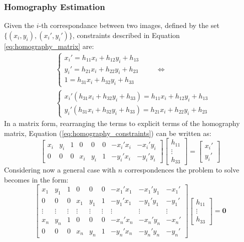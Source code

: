 \subsubsection{Homography Estimation}
Given the $i$-th correspondance between two images, defined by the set 
$\{(x_i, y_i), (x_i', y_i')\}$, constraints described in Equation \ref{eq:homography_matrix}
are:
\begin{align}
&\begin{cases}
    x_i' = h_{11} x_i + h_{12} y_i + h_{13} \\
    y_i' = h_{21} x_i + h_{22} y_i + h_{23} \\
    1 = h_{31} x_i + h_{32} y_i + h_{33}
\end{cases}
\qquad \Longleftrightarrow \nonumber\\[0.2cm]
&\begin{cases}
    x_i' \left(h_{31} x_i + h_{32} y_i + h_{33}\right) = h_{11} x_i + h_{12} y_i + h_{13} \\
    y_i' \left(h_{31} x_i + h_{32} y_i + h_{33}\right) = h_{21} x_i + h_{22} y_i + h_{23}
    \label{eq:homography_constraints}
\end{cases}
\end{align}
In a matrix form, rearranging the terms to explicit terms of the homography matrix,
Equation (\ref{eq:homography_constraints}) can be written as:
\begin{equation}
    \begin{bmatrix}
        x_i & y_i & 1 & 0 & 0 & 0 & -x_i'x_i & -x_i'y_i \\
        0 & 0 & 0 & x_i & y_i & 1 & -y_i'x_i & -y_i'y_i
    \end{bmatrix}
    \begin{bmatrix}
        h_{11} \\
        \vdots \\
        h_{33}
    \end{bmatrix}
    =
    \begin{bmatrix}
        x_i' \\
        y_i'
    \end{bmatrix}
    \label{eq:homography_matrix_constraints}
\end{equation}
Considering now a general case with $n$ correspondences the problem to solve 
becomes in the form:
\begin{equation}
\begin{bmatrix}
    x_1 & y_1 & 1 & 0 & 0 & 0 & -x_1'x_1 & -x_1'y_1 & -x_1'\\
    0 & 0 & 0 & x_1 & y_1 & 1 & -y_1'x_1 & -y_1'y_1 & -y_1'\\
    \vdots & \vdots & \vdots & \vdots & \vdots & \vdots & \vdots & \vdots & \vdots \\
    x_n & y_n & 1 & 0 & 0 & 0 & -x_n'x_n & -x_n'y_n & -x_n'\\
    0 & 0 & 0 & x_n & y_n & 1 & -y_n'x_n & -y_n'y_n & -y_n'
\end{bmatrix}
\begin{bmatrix}
    h_{11} \\
    \vdots \\
    h_{33}
\end{bmatrix}
=
\boldsymbol{0}
\label{eq:homography_matrix_constraints_general}
\end{equation}
